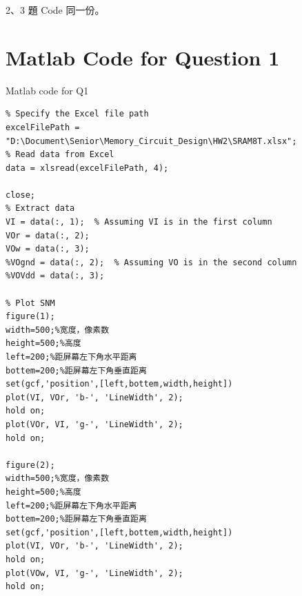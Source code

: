 \documentclass[a4paper]{article}
\newenvironment{code}{\captionsetup{type=listing, font=large, name=List.}}{}
\begin{document}
2、3 題 Code 同一份。

\section*{Matlab Code for Question 1}

\begin{code}
\caption{Matlab code for Q1}
\begin{verbatim}
% Specify the Excel file path
excelFilePath = "D:\Document\Senior\Memory_Circuit_Design\HW2\SRAM8T.xlsx";
% Read data from Excel
data = xlsread(excelFilePath, 4);

close; 
% Extract data
VI = data(:, 1);  % Assuming VI is in the first column
VOr = data(:, 2);
VOw = data(:, 3);
%VOgnd = data(:, 2);  % Assuming VO is in the second column
%VOVdd = data(:, 3);

% Plot SNM
figure(1);
width=500;%宽度，像素数
height=500;%高度
left=200;%距屏幕左下角水平距离
bottem=200;%距屏幕左下角垂直距离
set(gcf,'position',[left,bottem,width,height])
plot(VI, VOr, 'b-', 'LineWidth', 2);
hold on;
plot(VOr, VI, 'g-', 'LineWidth', 2);
hold on;

figure(2);
width=500;%宽度，像素数
height=500;%高度
left=200;%距屏幕左下角水平距离
bottem=200;%距屏幕左下角垂直距离
set(gcf,'position',[left,bottem,width,height])
plot(VI, VOr, 'b-', 'LineWidth', 2);
hold on;
plot(VOw, VI, 'g-', 'LineWidth', 2);
hold on;
\end{verbatim}
\end{code}
\end{document}
